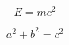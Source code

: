 \begin{equation}
E = mc^2
\label{eq:einstein}
\end{equation}

\begin{equation*}
a^2 + b^2 = c^2
\end{equation*}
